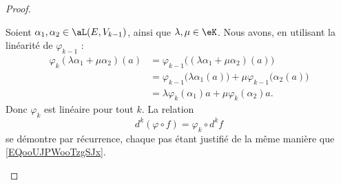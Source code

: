 \begin{proof}
	\begin{subproof}
		Soient \( \alpha_1,\alpha_2\in \aL(E,V_{k-1})\), ainsi que \( \lambda,\mu\in \eK\). Nous avons, en utilisant la linéarité de \( \varphi_{k-1}\) :
		\begin{subequations}
			\begin{align}
				\varphi_k(\lambda\alpha_1+\mu\alpha_2)(a) & =\varphi_{k-1}\big( (\lambda\alpha_1+\mu\alpha_2)(a) \big)                          \\
				                                          & =\varphi_{k-1}\big(\lambda \alpha_1(a)\big)+\mu\varphi_{k-1}\big( \alpha_2(a) \big) \\
				                                          & =\lambda\varphi_k(\alpha_1)a+\mu\varphi_k(\alpha_2)a.
			\end{align}
		\end{subequations}
		Donc \( \varphi_k\) est linéaire pour tout \( k\).
		\spitem[La relation]
		La relation
		\begin{equation}
			d^k(\varphi\circ f)=\varphi_k\circ d^kf
		\end{equation}
		se démontre par récurrence, chaque pas étant justifié de la même manière que \eqref{EQooUJPWooTzgSJx}.
	\end{subproof}
\end{proof}
